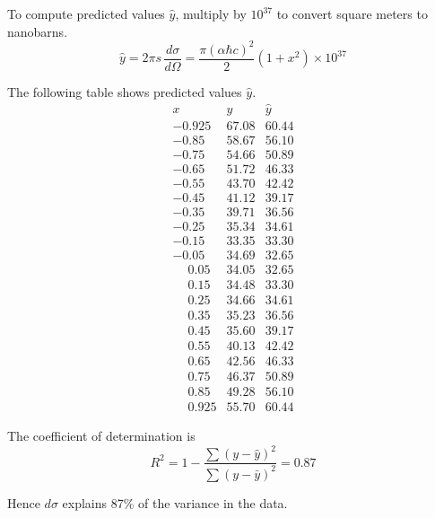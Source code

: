 To compute predicted values $\hat{y}$, multiply by $10^{37}$ to convert square meters to nanobarns.
\begin{equation*}
\hat y=2\pi s\,\frac{d\sigma}{d\Omega}
=\frac{\pi(\alpha\hbar c)^2}{2}\left(1+x^2\right)\times10^{37}
\end{equation*}

The following table shows predicted values $\hat{y}$.
\begin{equation*}
\begin{matrix}
x & y & \hat{y}
\\[1ex]
-0.925 & 67.08 & 60.44\\
-0.85\phantom{0} & 58.67 & 56.10\\
-0.75\phantom{0} & 54.66 & 50.89\\
-0.65\phantom{0} & 51.72 & 46.33\\
-0.55\phantom{0} & 43.70 & 42.42\\
-0.45\phantom{0} & 41.12 & 39.17\\
-0.35\phantom{0} & 39.71 & 36.56\\
-0.25\phantom{0} & 35.34 & 34.61\\
-0.15\phantom{0} & 33.35 & 33.30\\
-0.05\phantom{0} & 34.69 & 32.65\\
\phantom{+}0.05\phantom{0} & 34.05 & 32.65\\
\phantom{+}0.15\phantom{0} & 34.48 & 33.30\\
\phantom{+}0.25\phantom{0} & 34.66 & 34.61\\
\phantom{+}0.35\phantom{0} & 35.23 & 36.56\\
\phantom{+}0.45\phantom{0} & 35.60 & 39.17\\
\phantom{+}0.55\phantom{0} & 40.13 & 42.42\\
\phantom{+}0.65\phantom{0} & 42.56 & 46.33\\
\phantom{+}0.75\phantom{0} & 46.37 & 50.89\\
\phantom{+}0.85\phantom{0} & 49.28 & 56.10\\
\phantom{+}0.925 & 55.70 & 60.44
\end{matrix}
\end{equation*}

The coefficient of determination is
\begin{equation*}
R^2=1-\frac{\sum(y-\hat{y})^2}{\sum(y-\bar{y})^2}=0.87
\end{equation*}

Hence $d\sigma$ explains 87\% of the variance in the data.


